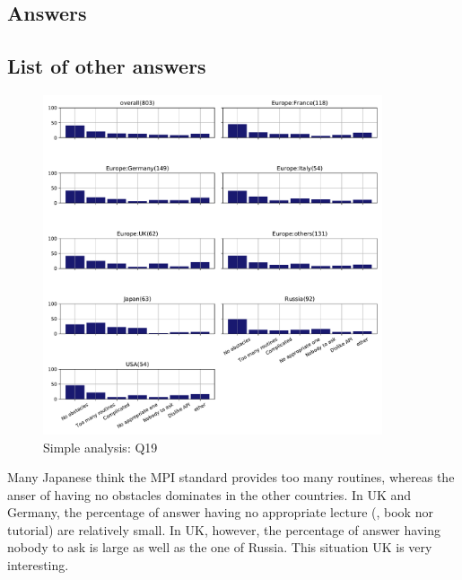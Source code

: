 
\subsection{Answers}


\subsection{List of other answers}
\begin{itemize}

\end{itemize}

\begin{figure}[htb]
\begin{center}
\includegraphics[width=10cm]{../pdfs/Q19.pdf}
\caption{Simple analysis: Q19}
\label{fig:Q19}
\end{center}
\end{figure}

Many Japanese think the MPI standard provides too many routines,
whereas the anser of having no obstacles dominates in the other
countries. In UK and Germany, the percentage of answer having no
appropriate lecture (, book nor tutorial) are relatively small. In UK,
however, the percentage of answer having nobody to ask is large as
well as the one of Russia.  This situation UK is very interesting. 
